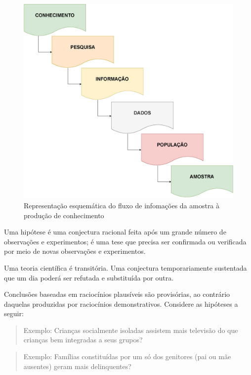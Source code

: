 \documentclass[
]{book}
\begin{document}
\hfill\break

\begin{figure}

{\centering \includegraphics[width=0.8\linewidth]{images7/esquema} 

}

\caption{Representação esquemática do fluxo de infomações da amostra à produção de conhecimento }\label{fig:fig34}
\end{figure}

\hfill\break

Uma hipótese é uma conjectura racional feita após um grande número de observações e experimentos; é uma tese que precisa ser confirmada ou verificada por meio de novas observações e experimentos.

\hfill\break

Uma teoria científica é transitória. Uma conjectura temporariamente sustentada que um dia poderá ser refutada e substituída por outra.

\hfill\break

Conclusões baseadas em raciocínios plausíveis são provisórias, ao contrário daquelas produzidas por raciocínios demonstrativos. Considere as hipóteses a seguir:

\hfill\break

\begin{quote}
Exemplo: Crianças socialmente isoladas assistem mais televisão do que crianças bem integradas a seus grupos?
\end{quote}

\begin{quote}
Exemplo: Famílias constituídas por um só dos genitores (pai ou mãe ausentes) geram mais delinquentes?
\end{quote}
\end{document}
